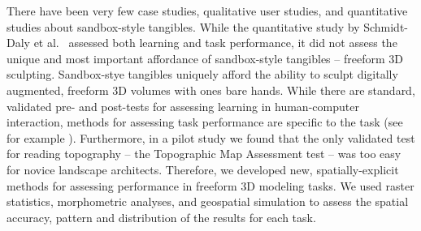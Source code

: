 There have been very few 
case studies, \cite{Ishii2002,Tateosian2010,Petrasova2015}
qualitative user studies, 
\cite{Shamonsky2003,Woods2016}
and quantitative studies \cite{Schmidt-daly2016b}
about sandbox-style tangibles.
%
%
While the quantitative study by
Schmidt-Daly et al.~\cite{Schmidt-daly2016b} 
assessed both learning and task performance,
it did not assess the unique and most important 
affordance of sandbox-style tangibles --
freeform 3D sculpting. 
% 
Sandbox-stye tangibles uniquely afford
the ability to sculpt digitally augmented, 
freeform 3D volumes
with ones bare hands. 
%
While there are standard, validated
pre- and post-tests for assessing learning
in human-computer interaction,
methods for assessing task performance 
are specific to the task
(see for example \cite{Cuendet2012}).
%
Furthermore,
in a pilot study we found that the only 
validated test for reading topography -- the
Topographic Map Assessment test
\cite{Newcombe2015} --
was too easy for novice landscape architects.
%
Therefore, we developed 
new, spatially-explicit methods
for assessing performance
in freeform 3D modeling tasks.
%
We used raster statistics, 
morphometric analyses, and geospatial simulation
to assess the spatial accuracy, pattern and distribution
of the results for each task. 
